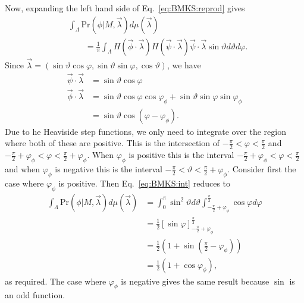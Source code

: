 \documentclass[DIV=calc,fontsize=12pt]{scrartcl} %
\theoremstyle{definition}
\theoremstyle{plain}
\begin{document}
Now, expanding the left hand side of Eq.~\eqref{eq:BMKS:reprod} gives
\begin{align}
\label{eq:BMKS:int}
&\int_{\Lambda} \text{Pr}(\phi|M,\vec{\lambda}) d\mu(\vec{\lambda}) \nonumber\\
&\quad\quad=
\frac{1}{\pi} \int_{\Lambda}  H (\vec{\phi} \cdot \vec{\lambda})
H \left ( \vec{\psi} \cdot \vec{\lambda} \right )
\vec{\psi} \cdot \vec{\lambda} \sin \vartheta d\vartheta d\varphi.
\end{align}
Since $\vec{\lambda} = (\sin \vartheta \cos \varphi, \sin \vartheta \sin
\varphi, \cos \vartheta)$, we have
\begin{align}
\vec{\psi} \cdot \vec{\lambda} & = \sin \vartheta \cos \varphi \\
\vec{\phi} \cdot \vec{\lambda} & = \sin \vartheta \cos \varphi \cos
\varphi_{\phi} + \sin \vartheta \sin \varphi \sin \varphi_{\phi} \\
& = \sin \vartheta \cos \left ( \varphi - \varphi_{\phi} \right ).
\end{align}
Due to he Heaviside step functions, we only need to integrate over the
region where both of these are positive.  This is the intersection of
$-\frac{\pi}{2} < \varphi < \frac{\pi}{2}$ and $-\frac{\pi}{2} +
\varphi_{\phi} < \varphi < \frac{\pi}{2} + \varphi_{\phi}$.  When
$\varphi_{\phi}$ is positive this is the interval $-\frac{\pi}{2} +
\varphi_{\phi} < \varphi < \frac{\pi}{2}$ and when $\varphi_{\phi}$ is
negative this is the interval $-\frac{\pi}{2} < \vartheta <
\frac{\pi}{2} + \varphi_{\phi}$.  Consider first the case where
$\varphi_{\phi}$ is positive.  Then Eq.~\eqref{eq:BMKS:int} reduces to
\begin{align}
\int_{\Lambda} \text{Pr}(\phi|M,\vec{\lambda}) d\mu(\vec{\lambda}) &
= \int_0^{\pi} \sin^2 \vartheta d \vartheta \int_{-\frac{\pi}{2} +
\varphi_{\phi}}^{\frac{\pi}{2}} \cos \varphi d \varphi  \\
& = \frac{1}{2} \left [ \sin \varphi \right ]_{-\frac{\pi}{2} +
\varphi_{\phi}}^{\frac{\pi}{2}} \\
& = \frac{1}{2} \left ( 1 + \sin \left ( \frac{\pi}{2} -
\varphi_{\phi}\right )\right ) \\
& = \frac{1}{2} \left ( 1 + \cos \varphi_{\phi} \right ),
\end{align}
as required.  The case where $\varphi_{\phi}$ is negative gives the
same result because $\sin$ is an odd function.
\end{document}
